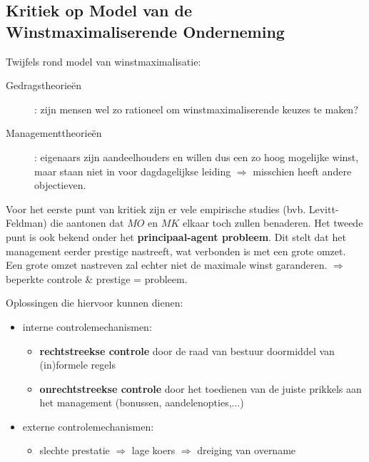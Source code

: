 \subsection{Kritiek op Model van de Winstmaximaliserende Onderneming}
Twijfels rond model van winstmaximalisatie:
\begin{description}
	\item[Gedragstheorie\"en]: zijn mensen wel zo rationeel om winstmaximaliserende keuzes te maken?
	\item[Managementtheorie\"en]: eigenaars zijn aandeelhouders en willen dus een zo hoog mogelijke winst, maar staan niet in voor dagdagelijkse leiding $\Rightarrow$ misschien heeft andere objectieven.
\end{description}

Voor het eerste punt van kritiek zijn er vele empirische studies (bvb. Levitt-Feldman) die aantonen dat $MO$ en $MK$ elkaar toch zullen benaderen. Het tweede punt is ook bekend onder het \textbf{principaal-agent probleem}. Dit stelt dat het management eerder prestige nastreeft, wat verbonden is met een grote omzet. Een grote omzet nastreven zal echter niet de maximale winst garanderen. $\Rightarrow$ beperkte controle \& prestige = probleem.

Oplossingen die hiervoor kunnen dienen:
\begin{itemize}
	\item interne controlemechanismen:
	\begin{itemize}
		\item \textbf{rechtstreekse controle} door de raad van bestuur doormiddel van (in)formele regels
		\item \textbf{onrechtstreekse controle} door het toedienen van de juiste prikkels aan het management (bonussen, aandelenopties,...)
	\end{itemize}
	\item externe controlemechanismen:
	\begin{itemize}
		\item slechte prestatie $\Rightarrow$ lage koers $\Rightarrow$ dreiging van overname
	\end{itemize}
\end{itemize}
